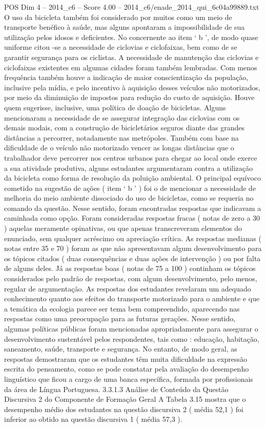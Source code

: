 \begin{textsample}{POS Dim 4 – 2014\_c6 – Score 4.00 – 2014\_c6/enade\_2014\_qui\_6c04a99889.txt}
O uso da bicicleta também foi considerado por muitos como um meio de transporte benéfico à saúde, mas alguns apontaram a impossibilidade de sua utilização pelos idosos e deficientes.
No concernente ao item ‘ b ’, de modo quase uniforme citou -se a necessidade de ciclovias e ciclofaixas, bem como de se garantir segurança para os ciclistas.
A necessidade de manutenção das ciclovias e ciclofaixas existentes em algumas cidades foram também lembradas.
Com menos frequência também houve a indicação de maior conscientização da população, inclusive pela mídia, e pelo incentivo à aquisição desses veículos não motorizados, por meio da diminuição de impostos para redução do custo de aquisição.
Houve quem sugerisse, inclusive, uma política de doação de bicicletas.
Alguns mencionaram a necessidade de se assegurar integração das ciclovias com os demais modais, com a construção de bicicletários seguros diante das grandes distâncias a percorrer, notadamente nas metrópoles.
Também com base na dificuldade de o veículo não motorizado vencer as longas distâncias que o trabalhador deve percorrer nos centros urbanos para chegar ao local onde exerce a sua atividade produtiva, alguns estudantes argumentaram contra a utilização da bicicleta como forma de resolução da poluição ambiental.
O principal equívoco cometido na sugestão de ações ( item ‘ b ’ ) foi o de mencionar a necessidade de melhoria do meio ambiente dissociado do uso de bicicletas, como se requeria no comando da questão.
Nesse sentido, foram encontradas respostas que indicavam a caminhada como opção.
Foram consideradas respostas fracas ( notas de zero a 30 ) aquelas meramente opinativas, ou que apenas transcreveram elementos do enunciado, sem qualquer acréscimo ou apreciação crítica.
As respostas medianas ( notas entre 35 e 70 ) foram as que não apresentavam algum desenvolvimento para os tópicos citados ( duas consequências e duas ações de intervenção ) ou por falta de alguns deles.
Já as respostas boas ( notas de 75 a 100 ) continham os tópicos considerados pelo padrão de respostas, com algum desenvolvimento, pelo menos, regular de argumentação.
As respostas dos estudantes revelaram um adequado conhecimento quanto aos efeitos do transporte motorizado para o ambiente e que a temática da ecologia parece ser tema bem compreendido, aparecendo nas respostas como uma preocupação para as futuras gerações.
Nesse sentido, algumas políticas públicas foram mencionadas apropriadamente para assegurar o desenvolvimento sustentável pelos respondentes, tais como : educação, habitação, saneamento, saúde, transporte e segurança.
No entanto, de modo geral, as respostas demostraram que os estudantes têm muita dificuldade na expressão escrita do pensamento, como se pode constatar pela avaliação do desempenho linguístico que ficou a cargo de uma banca específica, formada por profissionais da área de Língua Portuguesa. 3.3.1.3 Análise de Conteúdo da Questão Discursiva 2 do Componente de Formação Geral A Tabela 3.15 mostra que o desempenho médio dos estudantes na questão discursiva 2 ( média 52,1 ) foi inferior ao obtido na questão discursiva 1 ( média 57,3 ).

\end{textsample}
